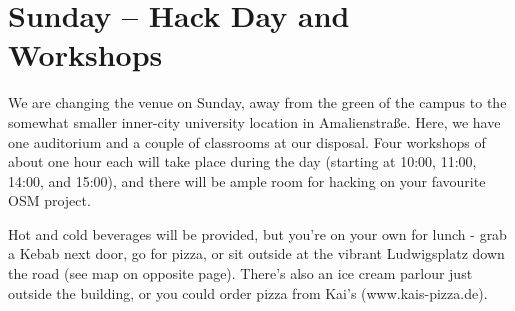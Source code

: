 \ClearWallPaper

\cropmarkswallpaper

\newpage
\section*{Sunday -- Hack Day and Workshops}

We are changing the venue on Sunday, away from the green of
the campus to the somewhat smaller inner-city university
location in Amalienstraße. Here, we have one auditorium and a
couple of classrooms at our disposal. Four workshops of about
one hour each will take place during the day (starting at 10:00,
11:00, 14:00, and 15:00), and there will be ample room for
hacking on your favourite OSM project.

Hot and cold beverages will be provided, but you're on your own
for lunch - grab a Kebab next door, go for pizza, or sit outside at
the vibrant Ludwigsplatz down the road (see map on opposite
page). There's also an ice cream parlour just outside the
building, or you could order pizza from Kai's (www.kais-pizza.de).
